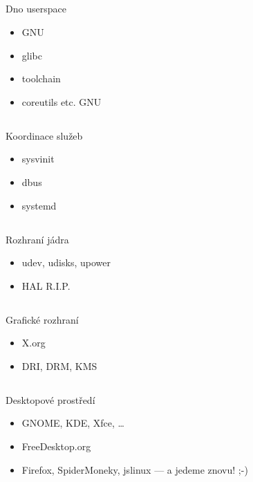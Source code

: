 \documentclass{beamer}
\begin{document}
\subsection{}
\begin{frame}{Dno userspace}
\begin{itemize}
\item GNU
\item glibc
\item toolchain
\item coreutils etc. GNU
\end{itemize}
\end{frame}

\subsection{}
\begin{frame}{Koordinace služeb}
\begin{itemize}
\item sysvinit
\item dbus
\item systemd
\end{itemize}
\end{frame}

\subsection{}
\begin{frame}{Rozhraní jádra}
\begin{itemize}
\item udev, udisks, upower
\item HAL R.I.P.
\end{itemize}
\end{frame}

\subsection{}
\begin{frame}{Grafické rozhraní}
\begin{itemize}
\item X.org
\item DRI, DRM, KMS
\end{itemize}
\end{frame}

\subsection{}
\begin{frame}{Desktopové prostředí}
\begin{itemize}
\item GNOME, KDE, Xfce, \dots
\item FreeDesktop.org
\item Firefox, SpiderMoneky, jslinux --- a jedeme znovu! ;-)
\end{itemize}
\end{frame}
\end{document}
